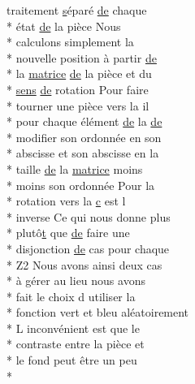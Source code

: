 \begin{DoxyCompactItemize}
traitement \hyperlink{gl_8h_ad585a1393cfa368fa9dc3d8ebff640d5}{s}éparé \hyperlink{mainpage_8dox_ab37fa35e77d95c6d0d0ab620c97c3db8}{de} chaque \\*
état \hyperlink{mainpage_8dox_ab37fa35e77d95c6d0d0ab620c97c3db8}{de} la pièce Nous \\*
calculons simplement la \\*
nouvelle position à partir \hyperlink{mainpage_8dox_ab37fa35e77d95c6d0d0ab620c97c3db8}{de} \\*
la \hyperlink{mainpage_8dox_af2e36bcdda8980a3e5c1f4013331ee45}{matrice} \hyperlink{mainpage_8dox_ab37fa35e77d95c6d0d0ab620c97c3db8}{de} la pièce et du \\*
\hyperlink{mainpage_8dox_aa08a2c237abaf70493855740d9c5d0c8}{sens} \hyperlink{mainpage_8dox_ab37fa35e77d95c6d0d0ab620c97c3db8}{de} rotation Pour faire \\*
tourner une pièce vers la il \\*
pour chaque élément \hyperlink{mainpage_8dox_ab37fa35e77d95c6d0d0ab620c97c3db8}{de} la \hyperlink{mainpage_8dox_ab37fa35e77d95c6d0d0ab620c97c3db8}{de} \\*
modifier son ordonnée en son \\*
abscisse et son abscisse en la \\*
taille \hyperlink{mainpage_8dox_ab37fa35e77d95c6d0d0ab620c97c3db8}{de} la \hyperlink{mainpage_8dox_af2e36bcdda8980a3e5c1f4013331ee45}{matrice} moins \\*
moins son ordonnée Pour la \\*
rotation vers la \hyperlink{glext_8h_a1f2d7f8147412c43ba2303a56f97ee73}{c} est l \\*
inverse Ce qui nous donne plus \\*
plutô\hyperlink{gl_8h_a00140d6f5c548b26daf170bf16e86a6d}{t} que \hyperlink{mainpage_8dox_ab37fa35e77d95c6d0d0ab620c97c3db8}{de} faire une \\*
disjonction \hyperlink{mainpage_8dox_ab37fa35e77d95c6d0d0ab620c97c3db8}{de} cas pour chaque \\*
Z2 Nous avons ainsi deux cas \\*
à \hyperlink{glext_8h_a9cd653b1648845554169fbc3a3f6d37a}{g}érer au lieu nous avons \\*
fait le choix d utiliser la \\*
fonction vert et bleu aléatoirement \\*
L inconvénient est que le \\*
contraste entre la pièce et \\*
le fond peut être un peu \\*

\end{DoxyCompactItemize}
